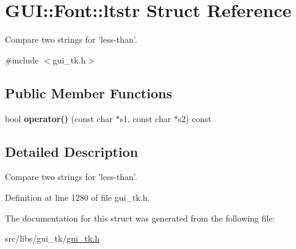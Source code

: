 \hypertarget{structGUI_1_1Font_1_1ltstr}{\section{G\-U\-I\-:\-:Font\-:\-:ltstr Struct Reference}
\label{structGUI_1_1Font_1_1ltstr}
}


Compare two strings for 'less-\/than'.  




{\ttfamily \#include $<$gui\-\_\-tk.\-h$>$}

\subsection*{Public Member Functions}
\begin{DoxyCompactItemize}
\item 
\hypertarget{structGUI_1_1Font_1_1ltstr_ac7c504afcbc1bb5c7d14c84b6fecedc2}{bool {\bfseries operator()} (const char $\ast$s1, const char $\ast$s2) const }\label{structGUI_1_1Font_1_1ltstr_ac7c504afcbc1bb5c7d14c84b6fecedc2}

\end{DoxyCompactItemize}


\subsection{Detailed Description}
Compare two strings for 'less-\/than'. 

Definition at line 1280 of file gui\-\_\-tk.\-h.



The documentation for this struct was generated from the following file\-:\begin{DoxyCompactItemize}
\item 
src/libs/gui\-\_\-tk/\hyperlink{gui__tk_8h}{gui\-\_\-tk.\-h}\end{DoxyCompactItemize}
